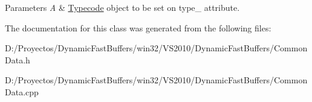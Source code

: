 \begin{DoxyParams}{Parameters}
{\em A} & \hyperlink{class_dynamic_fast_buffers_1_1_typecode}{Typecode} object to be set on type\-\_\- attribute. \\
\hline
\end{DoxyParams}


The documentation for this class was generated from the following files\-:\begin{DoxyCompactItemize}
\item 
D\-:/\-Proyectos/\-Dynamic\-Fast\-Buffers/win32/\-V\-S2010/\-Dynamic\-Fast\-Buffers/Common\-Data.\-h\item 
D\-:/\-Proyectos/\-Dynamic\-Fast\-Buffers/win32/\-V\-S2010/\-Dynamic\-Fast\-Buffers/Common\-Data.\-cpp\end{DoxyCompactItemize}
